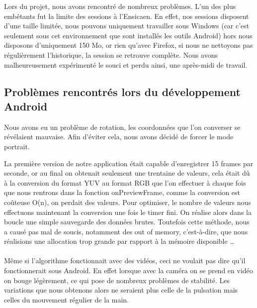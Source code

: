 Lors du projet, nous avons rencontré de nombreux problèmes. L'un des plus embêtants fut la limite des sessions à l'Ensicaen. En effet, nos sessions disposent d'une taille limitée, nous
 pouvons uniquement travailler sous Windows (car c'est seulement sous cet environnement que sont installés les outils Android) hors nous disposons d'uniquement 150 Mo, or rien qu'avec
  Firefox, si nous ne nettoyons pas régulièrement l'historique, la session se retrouve complète. Nous avons malheureusement expérimenté le souci et perdu ainsi, une après-midi de travail.

\subsection{Problèmes rencontrés lors du développement Android}

Nous avons eu un problème de rotation, les coordonnées que l'on converser se révélaient mauvaise. Afin d'éviter cela, nous avons décidé de forcer le mode portrait.

La première version de notre application était capable d'enregistrer 15 frames par seconde, or au final on obtenait seulement une trentaine de valeurs, cela était dû à la conversion du
 format YUV au format RGB que l'on effectuer à chaque fois que nous rentrons dans la fonction onPreviewFrame, comme la conversion est coûteuse O(n), on perdait des valeurs. Pour
  optimiser, le nombre de valeurs nous effectuons maintenant la conversion une fois le timer fini. On réalise alors dans la boucle une simple sauvegarde des données brutes.
Toutefois cette méthode, nous a causé pas mal de soucis, notamment des out of memory, c'est-à-dire, que nous réalisions une allocation trop grande par rapport à la mémoire disponible
\ldots{}\\
\\
Même si l'algorithme fonctionnait avec des vidéos, ceci ne voulait pas dire qu'il fonctionnerait sous Android. En effet lorsque avec la caméra on se prend en vidéo on bouge légèrement,
ce qui pose de nombreux problèmes de stabilité. Les variations que nous obtenons alors ne seraient plus celle de la pulsation mais celles du mouvement régulier de la main.
